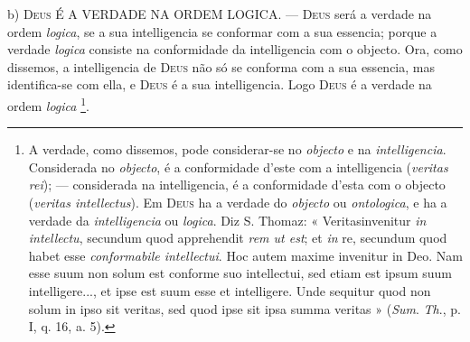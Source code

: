 b) \textsc{Deus} É A VERDADE NA ORDEM LOGICA. --- \textsc{Deus} será a verdade na ordem \emph{logica}, se a sua intelligencia se conformar com a sua essencia; porque a verdade \emph{logica} consiste na conformidade da intelligencia com o objecto. Ora, como dissemos, a intelligencia de \textsc{Deus} não só se conforma com a sua essencia, mas identifica-se com ella, e \textsc{Deus} é a sua intelligencia. Logo \textsc{Deus} é a verdade na ordem \emph{logica} \footnote{A verdade, como dissemos, pode considerar-se no \emph{objecto} e na \emph{intelligencia}. Considerada no \emph{objecto}, é a conformidade d'este com a intelligencia (\emph{veritas rei}); --- considerada na intelligencia, é a conformidade d'esta com o objecto (\emph{veritas intellectus}). Em \textsc{Deus} ha a verdade do \emph{objecto} ou \emph{ontologica}, e ha a verdade da \emph{intelligencia} ou \emph{logica}. Diz S. Thomaz: « Veritasinvenitur \emph{in intellectu}, secundum quod apprehendit \emph{rem ut est}; et \emph{in} re, secundum quod habet esse \emph{conformabile intellectui}. Hoc autem maxime invenitur in Deo. Nam esse suum non solum est conforme suo intellectui, sed etiam est ipsum suum intelligere..., et ipse est suum esse et intelligere. Unde sequitur quod non solum in ipso sit veritas, sed quod ipse sit ipsa summa veritas » (\emph{Sum}. \emph{Th}., p. I, q. 16, a. 5).}.

